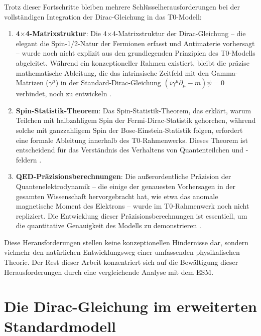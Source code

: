\documentclass[12pt,a4paper]{article}
\begin{document}
	Trotz dieser Fortschritte bleiben mehrere Schlüsselherausforderungen bei der vollständigen Integration der Dirac-Gleichung in das T0-Modell:
	
	\begin{enumerate}
		\item \textbf{4$\times$4-Matrix\-struktur}: Die 4$\times$4-Matrix\-struktur der Dirac-Gleichung – die elegant die Spin-1/2-Natur der Fermionen erfasst und Antimaterie vorhersagt – wurde noch nicht explizit aus den grundlegenden Prinzipien des T0-Modells abgeleitet. Während ein konzeptioneller Rahmen existiert, bleibt die präzise mathematische Ableitung, die das intrinsische Zeitfeld mit den Gamma-Matrizen ($\gamma^{\mu}$) in der Standard-Dirac-Gleichung $(i\gamma^{\mu}\partial_{\mu} - m)\psi = 0$ verbindet, noch zu entwickeln \cite{pascher_pragmatic_2025}.
		
		\item \textbf{Spin-Statistik-Theorem}: Das Spin-Statistik-Theorem, das erklärt, warum Teilchen mit halbzahligem Spin der Fermi-Dirac-Statistik gehorchen, während solche mit ganzzahligem Spin der Bose-Einstein-Statistik folgen, erfordert eine formale Ableitung innerhalb des T0-Rahmenwerks. Dieses Theorem ist entscheidend für das Verständnis des Verhaltens von Quantenteilchen und -feldern \cite{pascher_pragmatic_2025}.
		
		\item \textbf{QED-Präzisions\-berechnungen}: Die außerordentliche Präzision der Quantenelektrodynamik – die einige der genauesten Vorhersagen in der gesamten Wissenschaft hervorgebracht hat, wie etwa das anomale magnetische Moment des Elektrons – wurde im T0-Rahmenwerk noch nicht repliziert. Die Entwicklung dieser Präzisionsberechnungen ist essentiell, um die quantitative Genauigkeit des Modells zu demonstrieren \cite{pascher_pragmatic_2025}.
	\end{enumerate}
	
	Diese Herausforderungen stellen keine konzeptionellen Hindernisse dar, sondern vielmehr den natürlichen Entwicklungsweg einer umfassenden physikalischen Theorie. Der Rest dieser Arbeit konzentriert sich auf die Bewältigung dieser Herausforderungen durch eine vergleichende Analyse mit dem ESM.
	
	\section{Die Dirac-Gleichung im erweiterten Standardmodell}
	\label{sec:dirac_esm}
	
\end{document}
